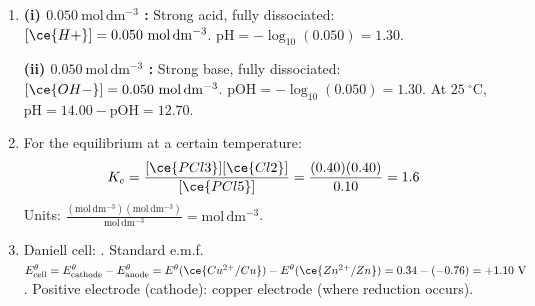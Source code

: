 \documentclass[11pt]{article}
\begin{document}
\begin{corrige}
\begin{enumerate}
\item \textbf{(i) $0.050\ \mathrm{mol\,dm^{-3}}$ :} Strong acid, fully dissociated: $[\ce{H+}] = 0.050\ \mathrm{mol\,dm^{-3}}$. $\mathrm{pH} = -\log_{10}(0.050) = 1.30$.
\par \textbf{(ii) $0.050\ \mathrm{mol\,dm^{-3}}$ :} Strong base, fully dissociated: $[\ce{OH-}] = 0.050\ \mathrm{mol\,dm^{-3}}$. $\mathrm{pOH} = -\log_{10}(0.050) = 1.30$. At $25\ ^\circ\mathrm{C}$, $\mathrm{pH} = 14.00 - \mathrm{pOH} = 12.70$.
\item For the equilibrium  at a certain temperature:
\[
K_c = \frac{[\ce{PCl3}][\ce{Cl2}]}{[\ce{PCl5}]} = \frac{(0.40)(0.40)}{0.10} = 1.6
\]
Units: $\frac{(\mathrm{mol\,dm^{-3}})(\mathrm{mol\,dm^{-3}})}{\mathrm{mol\,dm^{-3}}} = \mathrm{mol\,dm^{-3}}$.
\item Daniell cell: .
Standard e.m.f. $E^\theta_{\text{cell}} = E^\theta_{\text{cathode}} - E^\theta_{\text{anode}} = E^\theta(\ce{Cu^{2+}/Cu}) - E^\theta(\ce{Zn^{2+}/Zn}) = 0.34 - (-0.76) = +1.10\ \mathrm{V}$.
Positive electrode (cathode): copper electrode (where reduction  occurs).
\end{enumerate}
\end{corrige}
\end{document}
